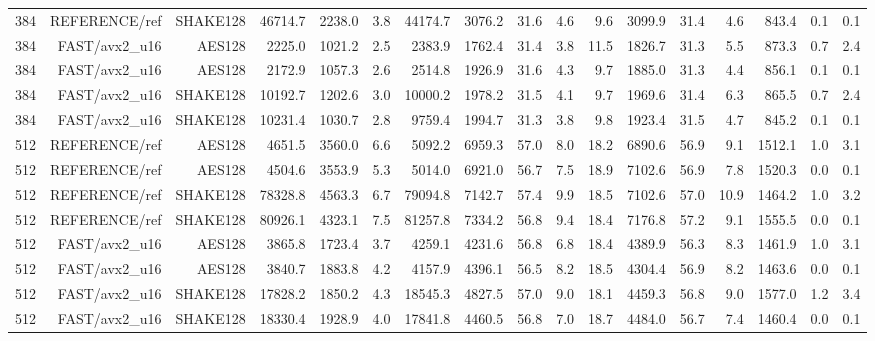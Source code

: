 \begin{table}[t]
\begin{tabular}{rrrrrrrrrrrrrrrrr}
384 & REFERENCE/ref & SHAKE128 & 46714.7 & 2238.0 & 3.8 & 44174.7 & 3076.2 & 31.6 & 4.6 & 9.6 & 3099.9 & 31.4 & 4.6 & 843.4 & 0.1 & 0.1 \\
384 & FAST/avx2_u16 & AES128 & 2225.0 & 1021.2 & 2.5 & 2383.9 & 1762.4 & 31.4 & 3.8 & 11.5 & 1826.7 & 31.3 & 5.5 & 873.3 & 0.7 & 2.4 \\
384 & FAST/avx2_u16 & AES128 & 2172.9 & 1057.3 & 2.6 & 2514.8 & 1926.9 & 31.6 & 4.3 & 9.7 & 1885.0 & 31.3 & 4.4 & 856.1 & 0.1 & 0.1 \\
384 & FAST/avx2_u16 & SHAKE128 & 10192.7 & 1202.6 & 3.0 & 10000.2 & 1978.2 & 31.5 & 4.1 & 9.7 & 1969.6 & 31.4 & 6.3 & 865.5 & 0.7 & 2.4 \\
384 & FAST/avx2_u16 & SHAKE128 & 10231.4 & 1030.7 & 2.8 & 9759.4 & 1994.7 & 31.3 & 3.8 & 9.8 & 1923.4 & 31.5 & 4.7 & 845.2 & 0.1 & 0.1 \\
512 & REFERENCE/ref & AES128 & 4651.5 & 3560.0 & 6.6 & 5092.2 & 6959.3 & 57.0 & 8.0 & 18.2 & 6890.6 & 56.9 & 9.1 & 1512.1 & 1.0 & 3.1 \\
512 & REFERENCE/ref & AES128 & 4504.6 & 3553.9 & 5.3 & 5014.0 & 6921.0 & 56.7 & 7.5 & 18.9 & 7102.6 & 56.9 & 7.8 & 1520.3 & 0.0 & 0.1 \\
512 & REFERENCE/ref & SHAKE128 & 78328.8 & 4563.3 & 6.7 & 79094.8 & 7142.7 & 57.4 & 9.9 & 18.5 & 7102.6 & 57.0 & 10.9 & 1464.2 & 1.0 & 3.2 \\
512 & REFERENCE/ref & SHAKE128 & 80926.1 & 4323.1 & 7.5 & 81257.8 & 7334.2 & 56.8 & 9.4 & 18.4 & 7176.8 & 57.2 & 9.1 & 1555.5 & 0.0 & 0.1 \\
512 & FAST/avx2_u16 & AES128 & 3865.8 & 1723.4 & 3.7 & 4259.1 & 4231.6 & 56.8 & 6.8 & 18.4 & 4389.9 & 56.3 & 8.3 & 1461.9 & 1.0 & 3.1 \\
512 & FAST/avx2_u16 & AES128 & 3840.7 & 1883.8 & 4.2 & 4157.9 & 4396.1 & 56.5 & 8.2 & 18.5 & 4304.4 & 56.9 & 8.2 & 1463.6 & 0.0 & 0.1 \\
512 & FAST/avx2_u16 & SHAKE128 & 17828.2 & 1850.2 & 4.3 & 18545.3 & 4827.5 & 57.0 & 9.0 & 18.1 & 4459.3 & 56.8 & 9.0 & 1577.0 & 1.2 & 3.4 \\
512 & FAST/avx2_u16 & SHAKE128 & 18330.4 & 1928.9 & 4.0 & 17841.8 & 4460.5 & 56.8 & 7.0 & 18.7 & 4484.0 & 56.7 & 7.4 & 1460.4 & 0.0 & 0.1 \\
\bottomrule
\end{tabular}
\end{table}
